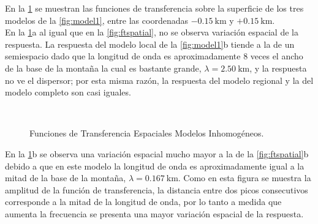 \documentclass[spanish,letterpaper,12pt,twoside,openany]{article}
\begin{document}
En la \cref{fig:ftspatialIn} se muestran las funciones de transferencia sobre la superficie de los tres modelos de la \cref{fig:model1}, entre las coordenadas $-0.15\ \text{km}$ y $+0.15\ \text{km}$.\\
%
En la \cref{fig:ftspatialIn}a al igual que en la \cref{fig:ftspatial}, no se observa variación espacial de la respuesta. La respuesta del modelo local de la \cref{fig:model1}b tiende a la de un semiespacio dado que la longitud de onda es aproximadamente $8$ veces el ancho de la base de la montaña la cual es bastante grande, $\lambda= 2.50\ \text{km}$, y la respuesta no ve el dispersor; por esta misma razón, la respuesta del modelo regional y la del modelo completo son casi iguales.
%
\begin{figure}[H]
	\centering
	\\
	\vspace{-.5 cm}
    \caption{Funciones de Transferencia Espaciales Modelos Inhomogéneos.}
    \label{fig:ftspatialIn}
    \vspace{-1 cm}
\end{figure}
%
En la \cref{fig:ftspatialIn}b se observa una variación espacial mucho mayor a la de la \cref{fig:ftspatial}b debido a que en este modelo la longitud de onda es aproximadamente igual a la mitad de la base de la montaña, $\lambda = 0.167\ \text{km}$. Como en esta figura se muestra la amplitud de la función de transferencia, la distancia entre dos picos consecutivos corresponde a la mitad de la longitud de onda, por lo tanto a medida que aumenta la frecuencia se presenta una mayor variación espacial de la respuesta.
\end{document}

